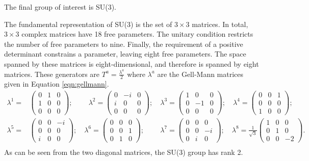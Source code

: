 The final group of interest is SU(3).

The fundamental representation of SU(3) is the set of $3\times3$ matrices.
In total, $3\times3$ complex matrices have 18 free parameters.
The unitary condition restricts the number of free parameters to nine.
Finally, the requirement of a positive determinant constrains a parameter, leaving eight free parameters.
The space spanned by these matrices is eight-dimensional, and therefore is spanned by eight matrices.
These generators are $T^a=\frac{\lambda^a}{2}$ where $\lambda^a$ are the Gell-Mann matrices given in Equation \ref{eqn:gellmann}.
\begin{equation}\begin{split}\label{eqn:gellmann}
    \lambda^1=&\begin{pmatrix}0&1&0\\ 1&0&0\\ 0&0&0\end{pmatrix};\phantom{-}\quad \lambda^2=\begin{pmatrix}0&-i&0\\ i&0&0\\ 0&0&0\end{pmatrix};\quad \lambda^3=\begin{pmatrix}1&0&0\\ 0&-1&0\\ 0&0&0\end{pmatrix};\quad \lambda^4=\begin{pmatrix}0&0&1\\ 0&0&0\\ 1&0&0\end{pmatrix};\quad \\
    \lambda^5=&\begin{pmatrix}0&0&-i\\ 0&0&0\\ i&0&0\end{pmatrix};\quad \lambda^6=\begin{pmatrix}0&0&0\\ 0&0&1\\ 0&1&0\end{pmatrix};\phantom{-}\quad \lambda^7=\begin{pmatrix}0&0&0\\ 0&0&-i\\ 0&i&0\end{pmatrix};\quad \lambda^8=\frac{1}{\sqrt{3}}\begin{pmatrix}1&0&0\\ 0&1&0\\ 0&0&-2\end{pmatrix}. \\
\end{split}\end{equation}
As can be seen from the two diagonal matrices, the SU(3) group has rank 2.

